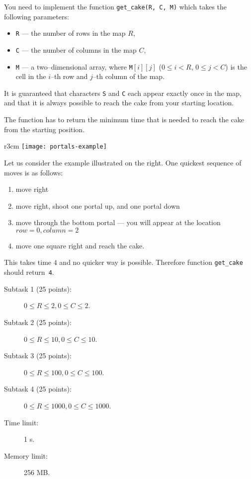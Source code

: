 \documentclass{boi2014}
\newcommand{\param}[1]{{\tt #1}}
\newcommand{\method}[1]{{\tt #1}}
\newcommand{\constant}[1]{{\tt #1}}
\begin{document}
    \Implementation
    You need to implement the function \method{get\_cake(R, C, M)}
    which takes the following parameters:
    \begin{itemize}
        \item \param{R} --- the number of rows in the map $R$,
        \item \param{C} --- the number of columns in the map $C$,
        \item \param{M} --- a two--dimensional array, where
            \param{M}$[i][j]$ ($0 \le i < R$, $0 \le j < C$) is the cell in
             the $i$--th row and $j$--th column of the map.
    \end{itemize}

    It is guaranteed that characters \constant{S} and \constant{C} each appear
    exactly once in the map, and that it is always possible to reach the cake
    from your starting location.

    The function has to return the minimum time that is needed to reach the cake
    from the starting position.

    \Example
    \begin{wrapfigure}[5]{r}{3cm}
        \texttt{[image: portals-example]}
    \end{wrapfigure}
    Let us consider the example illustrated on the right.
    One quickest sequence of moves is as follows:

    \begin{enumerate}
        \item move right
        \item move right, shoot one portal up, and one portal down
        \item move through the bottom portal --- you will appear at 
            the location $row = 0, column = 2$
        \item move one square right and reach the cake.
    \end{enumerate}

    This takes time $4$ and no quicker way is possible. Therefore
    function \method{get\_cake} should return~\constant{4}.

    \Scoring

    \begin{description}
        \item[Subtask 1 (25 points):] $0 \le R \le 2, 0 \le C \le 2$.
        \item[Subtask 2 (25 points):] $0 \le R \le 10, 0 \le C \le 10$.
        \item[Subtask 3 (25 points):] $0 \le R \le 100, 0 \le C \le 100$.
        \item[Subtask 4 (25 points):] $0 \le R \le 1000, 0 \le C \le 1000$.
    \end{description}

    \Constraints

    \begin{description}
        \item[Time limit:] 1 s.
        \item[Memory limit:] 256 MB.
    \end{description}

\end{document}
